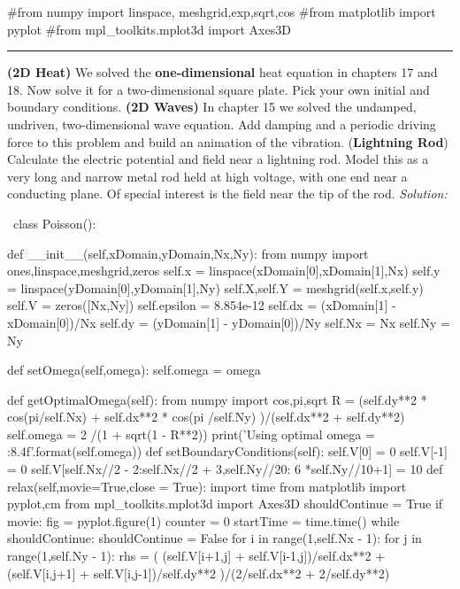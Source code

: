 \begin{enumerate}
\begin{codeexample}
\begin{VerbatimOut}{\listingFile}
#from numpy import linspace, meshgrid,exp,sqrt,cos
#from matplotlib import pyplot
#from mpl_toolkits.mplot3d import Axes3D
\end{VerbatimOut}
\end{codeexample}
\else
\noindent\rule{5 in}{0.01 in}
\fi


\prob \textbf{(2D Heat)} We solved the \textbf{one-dimensional} heat equation in chapters
  17 and 18.  Now solve it for a two-dimensional square plate. Pick
  your own initial and boundary conditions.
\prob \textbf{(2D Waves)} In chapter 15 we solved the undamped, undriven, two-dimensional
  wave equation.  Add damping and a periodic driving force to this
  problem and build an animation of the vibration.
\prob (\textbf{Lightning Rod})  Calculate the electric potential and
field near a lightning rod.  Model this as a very long and narrow
metal rod held at high voltage, with one end near a conducting plane.
Of special interest is the field near the tip of the rod.
\ifsolutions
\textit{Solution:}\\
\begin{codeexample}
\begin{VerbatimOut}{\listingFile}
\
class Poisson():

    def __init__(self,xDomain,yDomain,Nx,Ny):
        from numpy import ones,linspace,meshgrid,zeros
        self.x = linspace(xDomain[0],xDomain[1],Nx)
        self.y = linspace(yDomain[0],yDomain[1],Ny)
        self.X,self.Y = meshgrid(self.x,self.y)
        self.V = zeros([Nx,Ny])
        self.epsilon = 8.854e-12
        self.dx = (xDomain[1] - xDomain[0])/Nx
        self.dy = (yDomain[1] - yDomain[0])/Ny
        self.Nx = Nx
        self.Ny = Ny

    def setOmega(self,omega):
        self.omega = omega


    def getOptimalOmega(self):
        from numpy import cos,pi,sqrt
        R = (self.dy**2 * cos(pi/self.Nx) + self.dx**2 * cos(pi /self.Ny) )/(self.dx**2 + self.dy**2)
        self.omega = 2 /(1 + sqrt(1 - R**2))
        print('Using optimal omega = {:8.4f}'.format(self.omega))
    def setBoundaryConditions(self):
        self.V[0] = 0
        self.V[-1] = 0
        self.V[self.Nx//2 - 2:self.Nx//2 + 3,self.Ny//20: 6 *self.Ny//10+1] = 10
    def relax(self,movie=True,close = True):
        import time
        from matplotlib import pyplot,cm
        from mpl_toolkits.mplot3d import Axes3D
        shouldContinue = True
        if movie:
            fig = pyplot.figure(1)
        counter = 0
        startTime = time.time()
        while shouldContinue:
            shouldContinue = False
            for i in range(1,self.Nx - 1):
                for j in range(1,self.Ny - 1):
                    rhs =  ( (self.V[i+1,j] + self.V[i-1,j])/self.dx**2 + (self.V[i,j+1] + self.V[i,j-1])/self.dy**2  )/(2/self.dx**2 + 2/self.dy**2)


\end{VerbatimOut}
\end{codeexample}
\end{enumerate}
